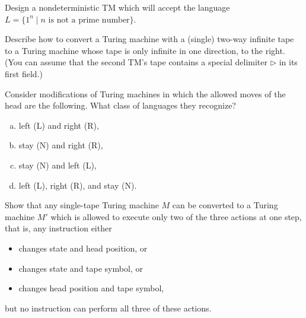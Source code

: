 \documentclass[a4paper,12pt]{amsart}
\begin{document}
\begin{problem}
    
    Design a nondeterministic TM which will accept the language $L=\{1^n \mid\text{$n$ is not a prime number}\}$.

\end{problem}


\begin{problem}

    Describe how to convert a Turing machine with a (single) two-way infinite tape to a Turing machine whose tape is only infinite in one direction, to the right. (You can assume that the second TM's tape contains a special delimiter $\triangleright$ in its first field.)

\end{problem}
    

\begin{problem}
    
    Consider modifications of Turing machines in which the allowed moves of the head are the following. What class of languages they recognize?
    \begin{multicols}{2}
        \begin{enumerate}[(a)]
            \item left (L) and right (R),
            \item stay (N) and right (R),
            \item stay (N) and left (L),
            \item left (L), right (R), and stay (N).
        \end{enumerate}    
    \end{multicols}

\end{problem}


\begin{problem}

    Show that any single-tape Turing machine $M$ can be converted to a Turing machine $M'$ which is allowed to execute only two of the three actions at one step, that is, any instruction either 
    \begin{itemize}
        \item changes state and head position, or
        \item changes state and tape symbol, or
        \item changes head position and tape symbol,
    \end{itemize}
    but no instruction can perform all three of these actions.

\end{problem}
\end{document}
